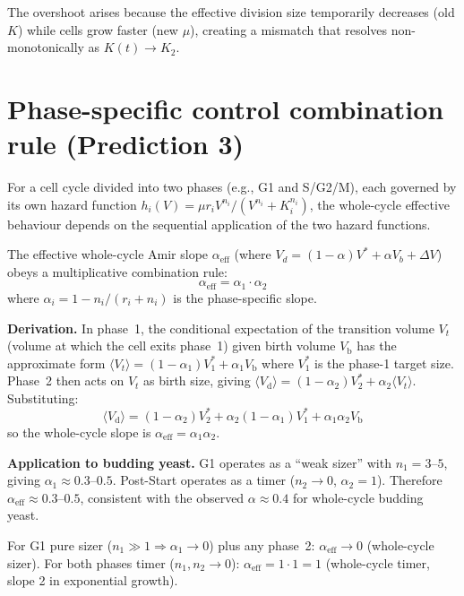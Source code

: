 \documentclass[11pt]{article}
\newcommand{\Vb}{V_{\mathrm{b}}}
\newcommand{\Vd}{V_{\mathrm{d}}}
\newcommand{\DV}{\Delta V}
\begin{document}
The overshoot arises because the effective division size temporarily
decreases (old $K$) while cells grow faster (new $\mu$), creating a
mismatch that resolves non-monotonically as $K(t) \to K_2$.

\section{Phase-specific control combination rule (Prediction 3)}

For a cell cycle divided into two phases (e.g., G1 and S/G2/M), each
governed by its own hazard function $h_i(V) = \mu r_i V^{n_i} /
(V^{n_i} + K_i^{n_i})$, the whole-cycle effective behaviour depends
on the sequential application of the two hazard functions.

The effective whole-cycle Amir slope $\alpha_{\mathrm{eff}}$
(where $V_d = (1-\alpha)V^* + \alpha V_b + \DV$) obeys a
multiplicative combination rule:
\begin{equation}
  \alpha_{\mathrm{eff}} = \alpha_1 \cdot \alpha_2
\end{equation}
where $\alpha_i = 1 - n_i/(r_i + n_i)$ is the phase-specific slope.

\textbf{Derivation.} In phase~1, the conditional expectation of the
transition volume $V_t$ (volume at which the cell exits phase~1) given
birth volume $\Vb$ has the approximate form
$\langle V_t \rangle = (1-\alpha_1) V_1^* + \alpha_1 \Vb$
where $V_1^*$ is the phase-1 target size.  Phase~2 then acts on $V_t$
as birth size, giving $\langle \Vd \rangle = (1-\alpha_2) V_2^* +
\alpha_2 \langle V_t \rangle$.  Substituting:
\begin{equation}
  \langle \Vd \rangle = (1-\alpha_2)V_2^* + \alpha_2(1-\alpha_1)V_1^*
    + \alpha_1 \alpha_2 \Vb
\end{equation}
so the whole-cycle slope is $\alpha_{\mathrm{eff}} = \alpha_1 \alpha_2$.

\textbf{Application to budding yeast.}  G1 operates as a ``weak
sizer'' with $n_1 = 3$--$5$, giving $\alpha_1 \approx 0.3$--$0.5$.
Post-Start operates as a timer ($n_2 \to 0$, $\alpha_2 = 1$).
Therefore $\alpha_{\mathrm{eff}} \approx 0.3$--$0.5$, consistent with
the observed $\alpha \approx 0.4$ for whole-cycle budding
yeast\cite{chandler2017}.

For G1 pure sizer ($n_1 \gg 1 \Rightarrow \alpha_1 \to 0$) plus any
phase~2: $\alpha_{\mathrm{eff}} \to 0$ (whole-cycle sizer).
For both phases timer ($n_1, n_2 \to 0$):
$\alpha_{\mathrm{eff}} = 1 \cdot 1 = 1$ (whole-cycle timer, slope 2
in exponential growth).
\end{document}
